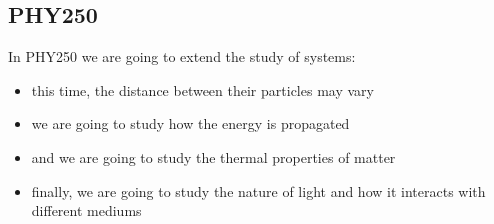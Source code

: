 \documentclass[]{beamer}
\begin{document}
  \subsection{PHY250}
\begin{frame}
In PHY250 we are going to extend the study of systems:

\vspace{5mm}

\pause
\begin{itemize}
  \item this time, the distance between their particles  may vary
  \pause
  \item we are going to study how the energy is propagated 
  \pause
  \item and we are going to study the thermal properties of matter
  \pause 
  \item finally, we are going to study the nature of light and how it interacts with different mediums 
\end{itemize}



    
    
    
\end{frame}
  
      

 
\end{document}
